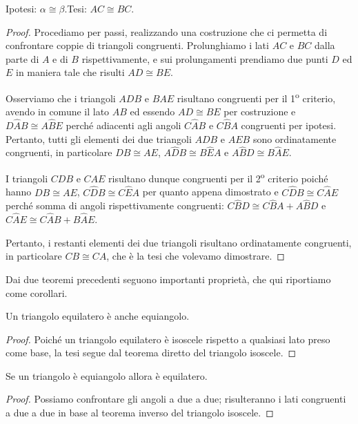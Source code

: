 \noindent Ipotesi: $\alpha\cong \beta$.\tab Tesi: $AC\cong BC$.

\begin{proof}
Procediamo per passi, realizzando una costruzione che ci permetta di confrontare coppie di triangoli congruenti. Prolunghiamo i lati $AC$ e $BC$ dalla parte di $A$ e di $B$ rispettivamente, e sui prolungamenti prendiamo due punti $D$ ed $E$ in maniera tale che risulti $AD\cong BE$.

Osserviamo che i triangoli $ADB$ e $BAE$ risultano congruenti per il 1\textsuperscript{o} criterio, avendo in comune il lato $AB$ ed essendo $AD\cong BE$ per costruzione e $D\widehat{A}B\cong A\widehat{B}E$ perché adiacenti agli angoli $C\widehat{A}B$ e $C\widehat{B}A$ congruenti per ipotesi. Pertanto, tutti gli elementi dei due triangoli $ADB$ e $AEB$ sono ordinatamente congruenti, in particolare $DB\cong AE$, $A\widehat{D}B\cong B\widehat{E}A$ e $A\widehat{B}D\cong B\widehat{A}E$.

I triangoli $CDB$ e $CAE$ risultano dunque congruenti per il 2\textsuperscript{o} criterio poiché hanno $DB\cong AE$, $C\widehat{D}B\cong C\widehat{E}A$ per quanto appena dimostrato e $C\widehat{D}B\cong C\widehat{A}E$ perché somma di angoli rispettivamente congruenti: $C\widehat{B}D\cong C\widehat{B}A + A\widehat{B}D$ e $C\widehat{A}E\cong C\widehat{A}B + B\widehat{A}E$.

Pertanto, i restanti elementi dei due triangoli risultano ordinatamente congruenti, in particolare $CB\cong CA$, che è la tesi che volevamo dimostrare.
\end{proof}


Dai due teoremi precedenti seguono importanti proprietà, che qui riportiamo come corollari.

\begin{corollario}
Un triangolo equilatero è anche equiangolo.
\end{corollario}

\begin{proof}
Poiché un triangolo equilatero è isoscele rispetto a qualsiasi lato preso come base, la tesi segue dal teorema diretto del triangolo isoscele.
\end{proof}

\begin{corollario}
Se un triangolo è equiangolo allora è equilatero.
\end{corollario}

\begin{proof}
Possiamo confrontare gli angoli a due a due; risulteranno i lati congruenti a due a due in base al teorema inverso del triangolo isoscele.
\end{proof}


